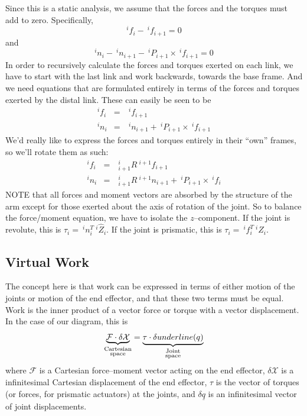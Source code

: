 \documentclass[]{article}
\begin{document}
Since this is a static analysis, we assume that the forces and the torques must add to zero. Specifically,
\begin{displaymath}
^{i}f_{i} - \ \!^{i}f_{i+1} = 0
\end{displaymath}
and
\begin{displaymath}
^{i}n_{i} - \ \!^{i}n_{i+1} - \ \!^{i}P_{i+1} \times \ \!^{i}f_{i+1} = 0
\end{displaymath}
In order to recursively calculate the forces and torques exerted on each link, we have to start with the last link and work backwards, towards the base frame. And we need equations that are formulated entirely in terms of the forces and torques exerted by the distal link. These can easily be seen to be
\begin{eqnarray}
^{i}f_{i} & = & \ \!^{i}f_{i+1} \\
^{i}n_{i} & = & \ \!^{i}n_{i+1} + \ \!^{i}P_{i+1} \times \ \!^{i}f_{i+1}
\end{eqnarray}
We'd really like to express the forces and torques entirely in their ``own'' frames, so we'll rotate them as such:
\begin{eqnarray}
^{i}f_{i} & = & \ \!^{i}_{i+1}R\ \!^{i+1}f_{i+1} \\
^{i}n_{i} & = &  \ \!^{i}_{i+1}R\ \!^{i+1}n_{i+1} + \ \!^{i}P_{i+1} \times \ \!^{i}f_{i}
\end{eqnarray}
NOTE that all forces and moment vectors are absorbed by the structure of the arm except for those exerted about the axis of rotation of the joint. So to balance the force/moment equation, we have to isolate the $z$--component. If the joint is revolute, this is $\tau_{i} = \ \!^{i}n_{i}^{T}\ \!^{i}\hat{Z}_{i}$. If the joint is prismatic, this is $\tau_{i} = \ \!^{i}f_{i}^{T}\ \!^{i}\hat{Z}_{i}$.

\subsection{Virtual Work}
The concept here is that work can be expressed in terms of either motion of the joints or motion of the end effector, and that these two terms must be equal. Work is the inner product of a vector force or torque with a vector displacement. In the case of our diagram, this is
\begin{displaymath}
	\underbrace{\mathcal{F} \cdot \delta\mathcal{X}}_{\substack{\text{Cartesian}\\\text{space}}} = \underbrace{\tau \cdot \delta\\underline(q)}_{\substack{\text{Joint}\\ \text{space}}}
\end{displaymath}
where $\mathcal{F}$ is a Cartesian force--moment vector acting on the end effector, $\delta\mathcal{X}$ is a infinitesimal Cartesian displacement of the end effector, $\tau$ is the vector of torques (or forces, for prismatic actuators) at the joints, and $\delta \underline{q}$ is an infinitesimal vector of joint displacements.
\end{document}
